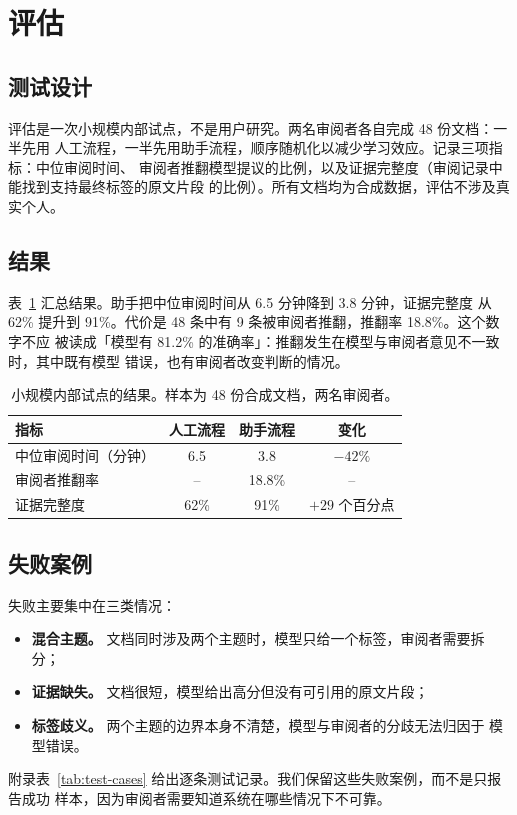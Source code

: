 \section{评估}
\label{sec:evaluation}

\subsection{测试设计}
\label{sec:test-design}

评估是一次小规模内部试点，不是用户研究。两名审阅者各自完成 48 份文档：一半先用
人工流程，一半先用助手流程，顺序随机化以减少学习效应。记录三项指标：中位审阅时间、
审阅者推翻模型提议的比例，以及证据完整度（审阅记录中能找到支持最终标签的原文片段
的比例）。所有文档均为合成数据，评估不涉及真实个人。

\subsection{结果}
\label{sec:results}

表~\ref{tab:results} 汇总结果。助手把中位审阅时间从 6.5 分钟降到 3.8 分钟，证据完整度
从 62\% 提升到 91\%。代价是 48 条中有 9 条被审阅者推翻，推翻率 18.8\%。这个数字不应
被读成「模型有 81.2\% 的准确率」：推翻发生在模型与审阅者意见不一致时，其中既有模型
错误，也有审阅者改变判断的情况。

\begin{table}[htbp]
  \centering
  \begin{tabular}{lccc}
    \toprule
    指标 & 人工流程 & 助手流程 & 变化 \\
    \midrule
    中位审阅时间（分钟） & 6.5 & 3.8 & $-42\%$ \\
    审阅者推翻率 & -- & 18.8\% & -- \\
    证据完整度 & 62\% & 91\% & $+29$ 个百分点 \\
    \bottomrule
  \end{tabular}
  \caption{小规模内部试点的结果。样本为 48 份合成文档，两名审阅者。}
  \label{tab:results}
\end{table}

\subsection{失败案例}
\label{sec:failures}

失败主要集中在三类情况：
\begin{itemize}
  \item \textbf{混合主题。} 文档同时涉及两个主题时，模型只给一个标签，审阅者需要拆分；
  \item \textbf{证据缺失。} 文档很短，模型给出高分但没有可引用的原文片段；
  \item \textbf{标签歧义。} 两个主题的边界本身不清楚，模型与审阅者的分歧无法归因于
        模型错误。
\end{itemize}

附录表~\ref{tab:test-cases} 给出逐条测试记录。我们保留这些失败案例，而不是只报告成功
样本，因为审阅者需要知道系统在哪些情况下不可靠。
